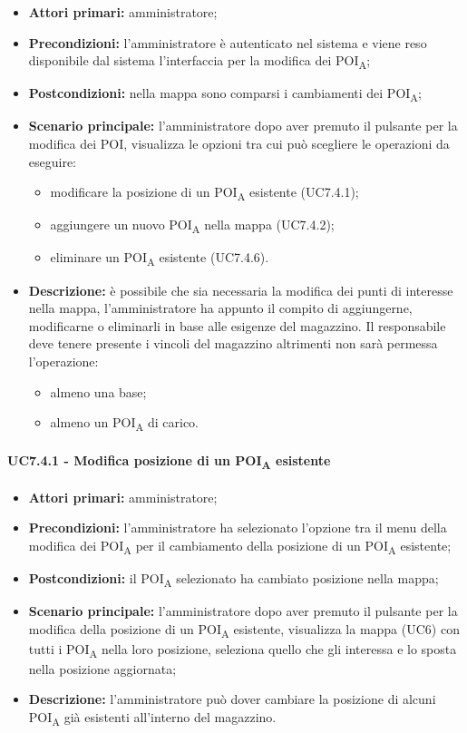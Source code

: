 \begin{itemize}
	\item 	\textbf{Attori primari:} amministratore;
	\item 	\textbf{Precondizioni:} l'amministratore è autenticato nel sistema e viene reso disponibile dal sistema l'interfaccia per la modifica dei POI\textsubscript{A};
	\item 	\textbf{Postcondizioni:} nella mappa sono comparsi i cambiamenti dei POI\textsubscript{A}; 
	\item 	\textbf{Scenario principale:} l'amministratore dopo aver premuto il pulsante per la modifica dei POI, visualizza le opzioni tra cui può scegliere le operazioni da eseguire:
	\begin{itemize}
		\item modificare la posizione di un POI\textsubscript{A} esistente (UC7.4.1);
		\item aggiungere un nuovo POI\textsubscript{A} nella mappa (UC7.4.2);
		\item eliminare un POI\textsubscript{A} esistente (UC7.4.6).
	\end{itemize}
	\item 	\textbf{Descrizione:} è possibile che sia necessaria la modifica dei punti di interesse nella mappa, l'amministratore ha appunto il compito di aggiungerne, modificarne o eliminarli in base alle esigenze del magazzino. Il responsabile deve tenere presente i vincoli del magazzino altrimenti non sarà permessa l'operazione:
	\begin{itemize}
		\item almeno una base;
		\item almeno un POI\textsubscript{A} di carico.
	\end{itemize}
\end{itemize}

\paragraph{UC7.4.1 - Modifica posizione di un POI\textsubscript{A} esistente}

\begin{itemize}
	\item 	\textbf{Attori primari:} amministratore;
	\item 	\textbf{Precondizioni:} l'amministratore ha selezionato l'opzione tra il menu della modifica dei POI\textsubscript{A} per il cambiamento della posizione di un POI\textsubscript{A} esistente;
	\item 	\textbf{Postcondizioni:} il POI\textsubscript{A} selezionato ha cambiato posizione nella mappa; 
	\item 	\textbf{Scenario principale:} l'amministratore dopo aver premuto il pulsante per la modifica della posizione di un POI\textsubscript{A} esistente, visualizza la mappa (UC6) con tutti i POI\textsubscript{A} nella loro posizione, seleziona quello che gli interessa e lo sposta nella posizione aggiornata;
	\item 	\textbf{Descrizione:} l'amministratore può dover cambiare la posizione di alcuni POI\textsubscript{A} già esistenti all'interno del magazzino.
\end{itemize}
